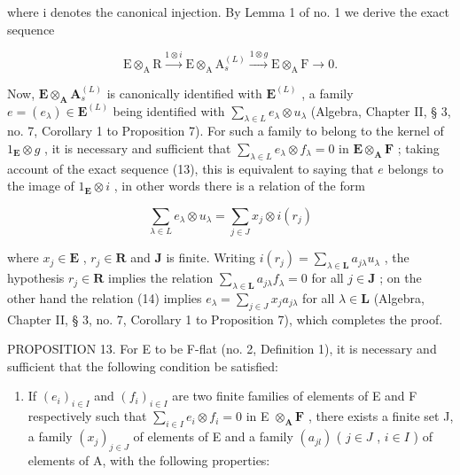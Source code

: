 where i denotes the canonical injection. By Lemma 1 of no. 1 we derive the exact sequence

\[
\mathrm{E} \otimes_ {\mathrm{A}} \mathrm{R} \xrightarrow {1 \otimes i} \mathrm{E} \otimes_ {\mathrm{A}} \mathrm{A} _ {s} ^ {(L)} \xrightarrow {1 \otimes g} \mathrm{E} \otimes_ {\mathrm{A}} \mathrm{F} \longrightarrow 0.\tag{13}
\]

Now, \(\mathbf{E} \otimes_{\mathbf{A}} \mathbf{A}_{s}^{(L)}\) is canonically identified with \(\mathbf{E}^{(L)}\) , a family \(e = (e_{\lambda}) \in \mathbf{E}^{(L)}\) being identified with \(\sum_{\lambda \in L} e_{\lambda} \otimes u_{\lambda}\) (Algebra, Chapter II, § 3, no. 7, Corollary 1 to Proposition 7). For such a family to belong to the kernel of \(1_{\mathbf{E}} \otimes g\) , it is necessary and sufficient that \(\sum_{\lambda \in L} e_{\lambda} \otimes f_{\lambda} = 0\) in \(\mathbf{E} \otimes_{\mathbf{A}} \mathbf{F}\) ; taking account of the exact sequence (13), this is equivalent to saying that \(e\) belongs to the image of \(1_{\mathbf{E}} \otimes i\) , in other words there is a relation of the form

\[
\sum_ {\lambda \in L} e _ {\lambda} \otimes u _ {\lambda} = \sum_ {j \in J} x _ {j} \otimes i (r _ {j})\tag{14}
\]

where \(x_{j} \in \mathbf{E}\) , \(r_{j} \in \mathbf{R}\) and \(\mathbf{J}\) is finite. Writing \(i(r_{j}) = \sum_{\lambda \in \mathbf{L}} a_{j\lambda} u_{\lambda}\) , the hypothesis \(r_{j} \in \mathbf{R}\) implies the relation \(\sum_{\lambda \in \mathbf{L}} a_{j\lambda} f_{\lambda} = 0\) for all \(j \in \mathbf{J}\) ; on the other hand the relation (14) implies \(e_{\lambda} = \sum_{j \in J} x_{j} a_{j\lambda}\) for all \(\lambda \in \mathbf{L}\) (Algebra, Chapter II, § 3, no. 7, Corollary 1 to Proposition 7), which completes the proof.

PROPOSITION 13. For E to be F-flat (no. 2, Definition 1), it is necessary and sufficient that the following condition be satisfied:

\begin{enumerate}
\def\labelenumi{(\Alph{enumi})}
\setcounter{enumi}{17}
\tightlist
\item
  If \((e_i)_{i \in I}\) and \((f_i)_{i \in I}\) are two finite families of elements of E and F respectively such that \(\sum_{i \in I} e_i \otimes f_i = 0\) in E \(\otimes_{\mathbf{A}} \mathbf{F}\) , there exists a finite set J, a family \((x_j)_{j \in J}\) of elements of E and a family \((a_{jl})\) ( \(j \in J\) , \(i \in I\) ) of elements of A, with the following properties:
\end{enumerate}

